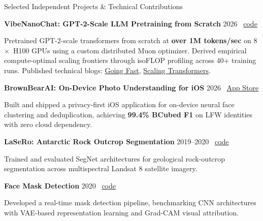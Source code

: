 \documentclass{resume}
\begin{document}
\begin{rSection}{Selected Independent Projects \& Technical Contributions}

\textbf{VibeNanoChat: GPT-2-Scale LLM Pretraining from Scratch} \hfill 2026 \textbar\ \href{https://github.com/divyanshu25/VibeNanoChat}{code} \\
{\raggedright Pretrained \mbox{GPT-2-scale} transformers from scratch at {\bf over 1M tokens/sec} on 8$\times$~H100 GPUs using a custom distributed Muon optimizer. Derived empirical \mbox{compute-optimal} scaling frontiers through isoFLOP profiling across 40+ training runs. Published technical blogs: \href{https://medium.com/@divyanshugoyal/going-fast-every-optimization-that-made-llm-training-fly-f465f3cf3588}{Going Fast}, \href{https://medium.com/@divyanshugoyal/a-lazy-engineers-guide-to-scaling-transformers-104e404e2f91}{Scaling Transformers}.\par}

\vspace{0.45em}
\textbf{BrownBearAI: On-Device Photo Understanding for iOS} \hfill 2026 \textbar\ \href{https://apps.apple.com/app/id6796580170}{App Store} \\
{\raggedright Built and shipped a \mbox{privacy-first} iOS application for \mbox{on-device} neural face clustering and deduplication, achieving {\bf 99.4\% BCubed F1} on LFW identities with zero cloud dependency.\par}

\vspace{0.45em}
\textbf{LaSeRo: Antarctic Rock Outcrop Segmentation} \hfill 2019--2020 \textbar\ \href{https://github.com/selkind/LaSeRo}{code} \\
{\raggedright Trained and evaluated SegNet architectures for geological \mbox{rock-outcrop} segmentation across multispectral Landsat 8 satellite imagery.\par}

\vspace{0.45em}
\textbf{Face Mask Detection} \hfill 2020 \textbar\ \href{https://github.com/divyanshu25/FaceMaskDetection}{code} \\
{\raggedright Developed a \mbox{real-time} mask detection pipeline, benchmarking CNN architectures with \mbox{VAE-based} representation learning and \mbox{Grad-CAM} visual attribution.\par}

\end{rSection}

\end{document}
